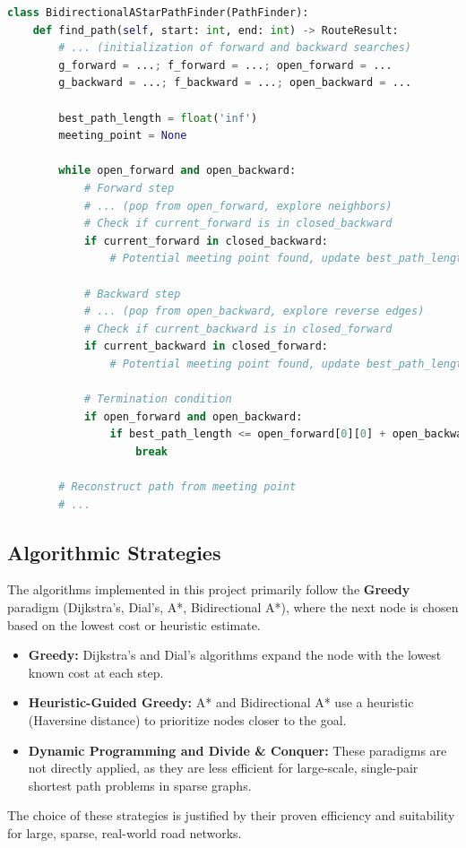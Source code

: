 \documentclass[12pt, a4paper]{report}
\begin{document}
\begin{lstlisting}[language=Python, caption={Code Snippet: `BidirectionalAStarPathFinder' from `algorithms.py'}, label={lst:bidir_astar}]
class BidirectionalAStarPathFinder(PathFinder):
    def find_path(self, start: int, end: int) -> RouteResult:
        # ... (initialization of forward and backward searches)
        g_forward = ...; f_forward = ...; open_forward = ...
        g_backward = ...; f_backward = ...; open_backward = ...

        best_path_length = float('inf')
        meeting_point = None

        while open_forward and open_backward:
            # Forward step
            # ... (pop from open_forward, explore neighbors)
            # Check if current_forward is in closed_backward
            if current_forward in closed_backward:
                # Potential meeting point found, update best_path_length

            # Backward step
            # ... (pop from open_backward, explore reverse edges)
            # Check if current_backward is in closed_forward
            if current_backward in closed_forward:
                # Potential meeting point found, update best_path_length
            
            # Termination condition
            if open_forward and open_backward:
                if best_path_length <= open_forward[0][0] + open_backward[0][0]:
                    break
        
        # Reconstruct path from meeting point
        # ...
\end{lstlisting}

\subsection{Algorithmic Strategies}
The algorithms implemented in this project primarily follow the \textbf{Greedy} paradigm (Dijkstra's, Dial's, A*, Bidirectional A*), where the next node is chosen based on the lowest cost or heuristic estimate. 
\begin{itemize}
    \item \textbf{Greedy:} Dijkstra's and Dial's algorithms expand the node with the lowest known cost at each step.
    \item \textbf{Heuristic-Guided Greedy:} A* and Bidirectional A* use a heuristic (Haversine distance) to prioritize nodes closer to the goal.
    \item \textbf{Dynamic Programming and Divide \& Conquer:} These paradigms are not directly applied, as they are less efficient for large-scale, single-pair shortest path problems in sparse graphs.
\end{itemize}
The choice of these strategies is justified by their proven efficiency and suitability for large, sparse, real-world road networks.
\end{document}
